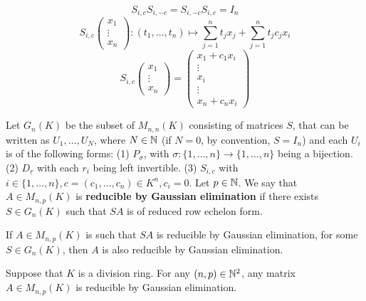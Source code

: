 \begin{box2}
    $$S_{i,c}S_{i,-c}=S_{i,-c}S_{i,c}=I_n$$
    $$S_{i,c}\begin{pmatrix}
 x_1\\
 \vdots\\
x_n
\end{pmatrix}:\left ( t_1,\dots,t_n \right ) \longmapsto\sum_{j=1}^{n}t_jx_j+\sum_{j=1}^{n} t_jc_jx_i $$
$$S_{i,c}\begin{pmatrix}
 x_1\\
 \vdots\\
x_n
\end{pmatrix}=\begin{pmatrix}
 x_1+c_1x_i\\
 \vdots\\
 x_i\\
 \vdots\\
x_n+c_nx_i
\end{pmatrix}$$
\end{box2}
\begin{definitionenv}
    Let $G_n(K)$ be the subset of $M_{n,n}(K)$ consisting of matrices $S$, that can be written as $U_1,\dots,U_N$, where $N\in\mathbb{N}$ (if $N=0$, by convention, $S=I_n$) and each $U_i$ is of the following forms:
    \newline
    (1) $P_\sigma$, with $\sigma:\{1,\dots,n\}\rightarrow\{1,\dots,n\}$ being a bijection.
    \newline
    (2) $D_{\underline{r}}$ with each $r_i$ being left invertible.
    \newline
    (3) $S_{i,c}$ with $i\in \{1,\dots,n\},c=\left(c_1,\dots,c_n\right)\in K^n,c_i=0$.
    \newline
    Let $p\in\mathbb{N}$. We say that $A\in M_{n,p}(K)$ is \textbf{reducible by Gaussian elimination} if there exists $S\in G_n(K)$ such that $SA$ is of reduced row echelon form.
\end{definitionenv}
\begin{lemmaenv}
    If $A\in M_{n,p}(K)$ is such that $SA$ is reducible by Gaussian elimination, for some $S\in G_n(K)$, then $A$ is also reducible by Gaussian elimination.
\end{lemmaenv}
\begin{theoremenv}
    Suppose that $K$ is a division ring. For any $(n,p)\in\mathbb{N}^2$, any matrix $A\in M_{n,p}(K)$ is reducible
    by Gaussian elimination.
\end{theoremenv}
